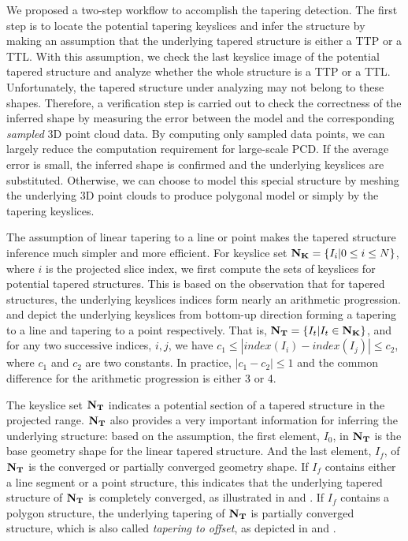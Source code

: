 We proposed a two-step workflow to accomplish the tapering detection.
The first step is to locate the potential tapering keyslices
and infer the structure by making an assumption that
the underlying tapered structure is either a TTP or a TTL.
With this assumption, we check the last keyslice image of the
potential tapered structure and analyze whether the whole structure
is a TTP or a TTL.
Unfortunately, the tapered structure under analyzing may not
belong to these shapes.
Therefore, a verification step is carried out to check the correctness
of the inferred shape by measuring the error between the model and
the corresponding {\it sampled} 3D point cloud data.
By computing only sampled data points, we can largely
reduce the computation requirement for large-scale PCD.
If the average error is small, the inferred shape is confirmed
and the underlying keyslices are substituted.
Otherwise, we can choose to model this special structure
by meshing the underlying 3D point clouds to produce polygonal model
or simply by the tapering keyslices.

The assumption of linear tapering to a line or point makes the
tapered structure inference much simpler and more efficient.
For keyslice set ${\bf N_K} = \{I_i | 0 \le i \le N \}$,
where $i$ is the projected slice index, we first compute
the sets of keyslices for potential tapered structures.
This is based on the observation that for tapered structures,
the underlying keyslices indices form nearly an arithmetic progression.
 and 
depict the underlying keyslices from bottom-up direction
forming a tapering to a line and tapering to a point respectively.
That is, $ {\bf N_T } = \{ I_t | I_t \in {\bf N_K} \}$,
and for any two successive indices, $i,j$,
we have $ c_1 \le | index(I_i) - index(I_j) | \le c_2 $,
where $c_1$ and $c_2$ are two constants.
In practice, $|c_1 - c_2| \le 1$ and the common difference
for the arithmetic progression is either 3 or 4.

The keyslice set ${\bf N_T}$ indicates a potential section of a
tapered structure in the projected range.
${\bf N_T}$ also provides a very important information for inferring the
underlying structure: based on the assumption, the first element, $I_0$,
in ${\bf N_T}$ is the base geometry shape for the linear tapered structure.
And the last element, $I_f$, of ${\bf N_T}$
is the converged or partially converged geometry shape.
If $I_f$ contains either a line segment or a point structure,
this indicates that the underlying tapered structure of ${\bf N_T}$
is completely converged, as illustrated in  and
.
If $I_f$ contains a polygon structure,
the underlying tapering of ${\bf N_T}$ is partially
converged structure, which is also called {\it tapering to offset},
as depicted in  and .

